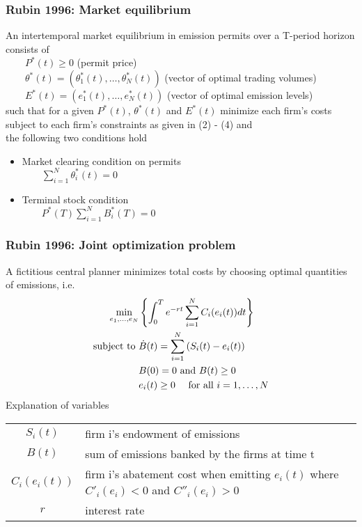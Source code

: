 \begin{frame}
\frametitle{Rubin 1996: Market equilibrium}
An intertemporal market equilibrium in emission permits over a T-period horizon consists of \\
$\qquad P^*(t) \ge 0$ (permit price) \\
$\qquad \theta^*(t) = (\theta^*_1(t), \ldots, \theta^*_N(t))$ (vector of optimal trading volumes) \\
$\qquad E^*(t) = (e^*_1(t), \ldots, e^*_N(t))$ (vector of optimal emission levels) \\
such that for a given $P^*(t)$,
$\theta^*(t)$ and $E^*(t)$ minimize each firm's costs subject to each firm's constraints as given in (2) - (4) and \\
the following two conditions hold
\begin{itemize}
\item Market clearing condition on permits \\
$
\qquad \sum_{i=1}^N \theta_i^*(t) = 0
$
\item Terminal stock condition \\
$
\qquad P^*(T)\sum_{i=1}^N B^*_i(T) = 0
$
\end{itemize}
\end{frame}

\begin{frame}
\frametitle{Rubin 1996: Joint optimization problem}
A fictitious central planner minimizes total costs by choosing optimal quantities of emissions, i.e.
\begin{align}
\min_{e_1, \ldots, e_N} &\left\{ \int_0^T e^{-rt} \sum_{i=1}^N C_i(e_i(t)) dt \right\} \\
\textnormal{subject to }
&\dot{B}(t) = \sum_{i=1}^N \left(S_i(t) - e_i(t)\right) \\
&            B(0) = 0 \textnormal{ and } B(t) \ge 0 \\
&            e_i(t) \ge 0 \quad \textnormal{ for all } i = 1, \ldots, N
\end{align}
{Explanation of variables}
\begin{tiny}
\begin{tabular}{cl}
$S_i(t)$ & firm i's endowment of emissions \\
$B(t)$ & sum of emissions banked by the firms at time t\\
$C_i(e_i(t))$ & firm i's abatement cost when emitting $e_i(t)$ where $C'_i(e_i) < 0$ and $C''_i(e_i) > 0$ \\
$r$ & interest rate \\
\end{tabular}
\end{tiny}
\end{frame}


